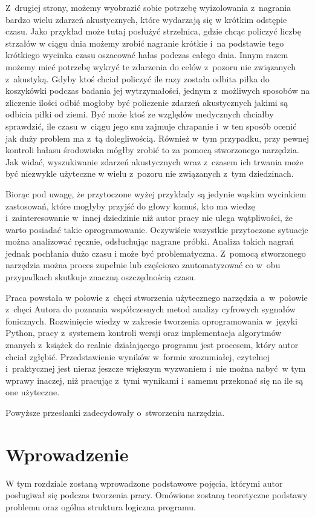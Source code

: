 \documentclass[eng,printmode]{mgr}
\begin{document}
Z~drugiej strony, możemy wyobrazić sobie potrzebę wyizolowania z~nagrania bardzo wielu zdarzeń akustycznych, które wydarzają się w krótkim odstępie czasu. Jako przykład może tutaj posłużyć strzelnica, gdzie chcąc policzyć liczbę strzałów w ciągu dnia możemy zrobić nagranie krótkie i~na podstawie tego krótkiego wycinka czasu oszacować hałas podczas całego dnia. Innym razem możemy mieć potrzebę wykryć te zdarzenia do celów z~pozoru nie związanych z~akustyką. Gdyby ktoś chciał policzyć ile razy została odbita piłka do koszykówki podczas badania jej wytrzymałości, jednym z~możliwych sposobów na zliczenie ilości odbić mogłoby być policzenie zdarzeń akustycznych jakimi są odbicia piłki od ziemi. Być może ktoś ze względów medycznych chciałby sprawdzić, ile czasu w~ciągu jego snu zajmuje chrapanie i~w ten sposób ocenić jak duży problem ma z~tą dolegliwością. Również w~tym przypadku, przy pewnej kontroli hałasu środowiska mógłby zrobić to za pomocą stworzonego narzędzia. Jak widać, wyszukiwanie zdarzeń akustycznych wraz z~czasem ich trwania może być niezwykle użyteczne w wielu z~pozoru nie związanych z~tym dziedzinach. 

Biorąc pod uwagę, że przytoczone wyżej przykłady są jedynie wąskim wycinkiem zastosowań, które mogłyby przyjść do głowy komuś, kto ma wiedzę i~zainteresowanie w~innej dziedzinie niż autor pracy nie ulega wątpliwości, że warto posiadać takie oprogramowanie. Oczywiście wszystkie przytoczone sytuacje można analizować ręcznie, odsłuchując nagrane próbki. Analiza takich nagrań jednak pochłania dużo czasu i może być problematyczna. Z~pomocą stworzonego narzędzia można proces zupełnie lub częściowo zautomatyzować co w~obu przypadkach skutkuje znaczną oszczędnością czasu. 

Praca powstała w połowie z~chęci stworzenia użytecznego narzędzia a~w~połowie z~chęci Autora do poznania współczesnych metod analizy cyfrowych sygnałów fonicznych. Rozwinięcie wiedzy w zakresie tworzenia oprogramowania w~języki Python, pracy z~systemem kontroli wersji oraz implementacja algorytmów znanych z~książek do realnie działającego programu jest procesem, który autor chciał zgłębić. Przedstawienie wyników w~formie zrozumiałej, czytelnej i~praktycznej jest nieraz jeszcze większym wyzwaniem i~nie można nabyć~w tym wprawy inaczej, niż pracując z~tymi wynikami i~samemu przekonać się na ile są one użyteczne.

Powyższe przesłanki zadecydowały o~stworzeniu narzędzia. 

\chapter{Wprowadzenie}
W tym rozdziale zostaną wprowadzone podstawowe pojęcia, którymi autor posługiwał się podczas tworzenia pracy. Omówione zostaną teoretyczne podstawy problemu oraz ogólna struktura logiczna programu.
\end{document}
